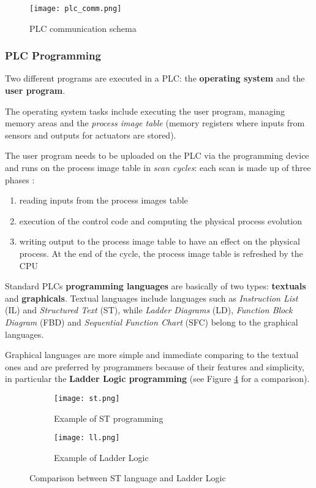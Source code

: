 \begin{figure}[ht]
	\centering
	\texttt{[image: plc\_comm.png]}
	\caption{PLC communication schema}
	\label{fig:PLC_comm}
\end{figure}

\subsubsection{PLC Programming}
\label{subsubsec:plc_programming}
Two different programs are executed in a PLC: the \textbf{operating system} and the \textbf{user program}.

\bigskip
The operating system tasks include executing the user program, managing memory areas and the \textit{process image table} (memory registers where inputs from sensors and outputs for actuators are stored).

\bigskip
The user program needs to be uploaded on the PLC via the programming device and runs on the process image table in \textit{scan cycles}: each scan is made up of three phases \cite{ceccato}:

\begin{enumerate}
	\item reading inputs from the process images table
	\item execution of the control code and computing the physical process evolution
	\item writing output to the process image table to have an effect on the physical process. At the end of the cycle, the process image table is refreshed by the CPU
\end{enumerate}

Standard PLCs \textbf{programming languages} are basically of two types: \textbf{textuals} and \textbf{graphicals}.
Textual languages include languages such as \textit{Instruction List} (IL) and \textit{Structured Text} (ST), while \textit{Ladder Diagrams} (LD), \textit{Function Block Diagram} (FBD) and \textit{Sequential Function Chart} (SFC) belong to the graphical languages.

\bigskip
Graphical languages are more simple and immediate comparing to the textual ones and are preferred by programmers because of their features and simplicity, in particular the \textbf{Ladder Logic programming} (see Figure \ref{fig:st_ll_comparison} for a comparison).

\begin{figure}[ht]
	\centering
	\begin{subfigure}{0.47\textwidth}
		\texttt{[image: st.png]}
		\caption{Example of ST programming}
		\label{subfig:st_example}
	\end{subfigure}
	\hfill
	\begin{subfigure}{0.47\textwidth}
		\texttt{[image: ll.png]}
		\caption{Example of Ladder Logic}
		\label{subfig:ladder_logic_example}
	\end{subfigure}
	\caption{Comparison between ST language and Ladder Logic}
	\label{fig:st_ll_comparison}
	
\end{figure}

